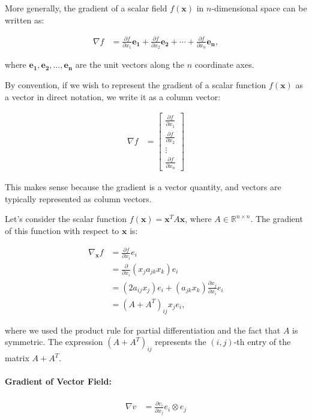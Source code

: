 More generally, the gradient of a scalar field $f(\mathbf{x})$ in $n$-dimensional space can be written as:

\begin{align}
\nabla f &= \frac{\partial f}{\partial x_1} \mathbf{e_1} + \frac{\partial f}{\partial x_2} \mathbf{e_2} + \cdots + \frac{\partial f}{\partial x_n} \mathbf{e_n},
\end{align}

where $\mathbf{e_1}, \mathbf{e_2}, \dots, \mathbf{e_n}$ are the unit vectors along the $n$ coordinate axes.

By convention, if we wish to represent the gradient of a scalar function $f(\mathbf{x})$ as a vector in direct notation, we write it as a column vector:

\begin{align}
\nabla f &= \begin{bmatrix}
\frac{\partial f}{\partial x_1} 
\\
\frac{\partial f}{\partial x_2} 
\\
\vdots 
\\
\frac{\partial f}{\partial x_n}
\end{bmatrix}
\end{align}

This makes sense because the gradient is a vector quantity, and vectors are typically represented as column vectors.

\begin{example}
    Let's consider the scalar function $f(\mathbf{x}) = \mathbf{x}^T A \mathbf{x}$, where $A \in \mathbb{R}^{n \times n}$. The gradient of this function with respect to $\mathbf{x}$ is:
    
    \begin{align}
    \nabla_{\mathbf{x}} f &= \frac{\partial f}{\partial x_i} e_i \\
    &= \frac{\partial}{\partial x_i} (x_j a_{jk} x_k) e_i \\
    &= (2 a_{ij} x_j) e_i + (a_{jk} x_k) \frac{\partial x_j}{\partial x_i} e_i \\
    &= (A + A^T)_{ij} x_j e_i,
    \end{align}
    
    where we used the product rule for partial differentiation and the fact that $A$ is symmetric. The expression $(A + A^T)_{ij}$ represents the $(i,j)$-th entry of the matrix $A + A^T$.
\end{example}

\paragraph{Gradient of Vector Field:}
\begin{align}
\nabla v &= \frac{\partial v_i}{\partial x_j} e_i\otimes e_j
\end{align}

